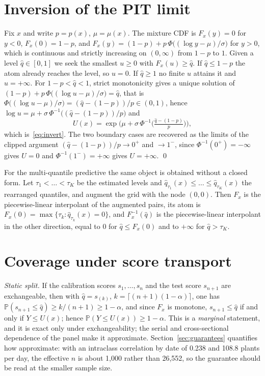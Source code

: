 \documentclass[preprint,3p,times]{elsarticle}
\begin{document}
\section{Inversion of the PIT limit}
\label{app:inversion}

Fix $x$ and write $p=p(x)$, $\mu=\mu(x)$. The mixture CDF is $F_x(y)=0$ for $y<0$, $F_x(0)=1-p$, and $F_x(y)=(1-p)+p\,\Phi\big((\log y-\mu)/\sigma\big)$ for $y>0$, which is continuous and strictly increasing on $(0,\infty)$ from $1-p$ to $1$. Given a level $\hat q\in[0,1]$ we seek the smallest $u\ge 0$ with $F_x(u)\ge \hat q$. If $\hat q\le 1-p$ the atom already reaches the level, so $u=0$. If $\hat q\ge 1$ no finite $u$ attains it and $u=+\infty$. For $1-p<\hat q<1$, strict monotonicity gives a unique solution of $(1-p)+p\,\Phi\big((\log u-\mu)/\sigma\big)=\hat q$, that is $\Phi\big((\log u-\mu)/\sigma\big)=(\hat q-(1-p))/p\in(0,1)$, hence $\log u=\mu+\sigma\,\Phi^{-1}\big((\hat q-(1-p))/p\big)$ and
\[
U(x)=\exp\!\Big(\mu+\sigma\,\Phi^{-1}\big(\tfrac{\hat q-(1-p)}{p}\big)\Big),
\]
which is~\eqref{eq:invert}. The two boundary cases are recovered as the limits of the clipped argument $(\hat q-(1-p))/p\to 0^+$ and $\to 1^-$, since $\Phi^{-1}(0^+)=-\infty$ gives $U=0$ and $\Phi^{-1}(1^-)=+\infty$ gives $U=+\infty$. \qed

For the multi-quantile predictive the same object is obtained without a closed form. Let $\tau_1<\dots<\tau_K$ be the estimated levels and $\hat q_{\tau_1}(x)\le\dots\le\hat q_{\tau_K}(x)$ the rearranged quantiles, and augment the grid with the node $(0,0)$. Then $F_x$ is the piecewise-linear interpolant of the augmented pairs, its atom is $F_x(0)=\max\{\tau_k:\hat q_{\tau_k}(x)=0\}$, and $F_x^{-1}(\hat q)$ is the piecewise-linear interpolant in the other direction, equal to $0$ for $\hat q\le F_x(0)$ and to $+\infty$ for $\hat q>\tau_K$.

\section{Coverage under score transport}
\label{app:coverage}

\emph{Static split.} If the calibration scores $s_1,\dots,s_n$ and the test score $s_{n+1}$ are exchangeable, then with $\hat q=s_{(k)}$, $k=\lceil(n+1)(1-\alpha)\rceil$, one has $\mathbb{P}(s_{n+1}\le\hat q)\ge k/(n+1)\ge 1-\alpha$, and since $F_x$ is monotone, $s_{n+1}\le\hat q$ if and only if $Y\le U(x)$; hence $\mathbb{P}(Y\le U(x))\ge 1-\alpha$. This is a \emph{marginal} statement, and it is exact only under exchangeability; the serial and cross-sectional dependence of the panel make it approximate. Section~\ref{sec:guarantees} quantifies how approximate: with an intraclass correlation by date of 0.238 and 108.8 plants per day, the effective $n$ is about 1{,}000 rather than 26{,}552, so the guarantee should be read at the smaller sample size.
\end{document}
